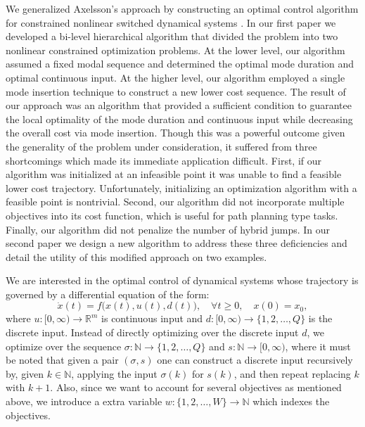 We generalized Axelsson's approach by constructing an optimal control algorithm for constrained nonlinear switched dynamical systems \cite{gonzalez2010descent, gonzalez2010cdc}. In our first paper we developed a bi-level hierarchical algorithm that divided the problem into two nonlinear constrained optimization problems. At the lower level, our algorithm assumed a fixed modal sequence and determined the optimal mode duration and optimal continuous input. At the higher level, our algorithm employed a single mode insertion technique to construct a new lower cost sequence. The result of our approach was an algorithm that provided a sufficient condition to guarantee the local optimality of the mode duration and continuous input while decreasing the overall cost via mode insertion. Though this was a powerful outcome given the generality of the problem under consideration, it suffered from three shortcomings which made its immediate application difficult. First, if our algorithm was initialized at an infeasible point it was unable to find a feasible lower cost trajectory. Unfortunately, initializing an optimization algorithm with a feasible point is nontrivial. Second, our algorithm did not incorporate multiple objectives into its cost function, which is useful for path planning type tasks. Finally, our algorithm did not penalize the number of hybrid jumps. In our second paper we design a new algorithm to address these three deficiencies and detail the utility of this modified approach on two examples.


We are interested in the optimal control of dynamical systems whose trajectory is governed by a differential equation of the form:
\begin{equation}
  \dot{x}(t) = f\big( x(t), u(t), d(t) \big), \quad \forall t\geq0,\quad x(0) = x_0,
\end{equation}
where $u: [0,\infty) \to \mathbb{R}^m$ is continuous input and $d: [0,\infty) \to \{ 1, 2, \ldots, Q \}$ is the discrete input. Instead of directly optimizing over the discrete input $d$, we optimize over the sequence $\sigma: \mathbb{N} \to \{ 1, 2, \ldots, Q \}$ and $s: \mathbb{N} \to [0,\infty)$, where it must be noted that given a pair $(\sigma,s)$ one can construct a discrete input recursively by, given $k \in \mathbb{N}$, applying the input $\sigma(k)$ for $s(k)$, and then repeat replacing $k$ with $k+1$. Also, since we want to account for several objectives as mentioned above, we introduce a extra variable $w: \{ 1, 2, \ldots, W \} \to \mathbb{N}$ which indexes the objectives.

